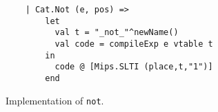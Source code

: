 \begin{figure}
    \centering
    \begin{lstlisting}
    | Cat.Not (e, pos) =>
        let
          val t = "_not_"^newName()
          val code = compileExp e vtable t
        in
          code @ [Mips.SLTI (place,t,"1")]
        end
    \end{lstlisting}
    \label{fig:compiler:not}
    \caption{Implementation of \texttt{not}.}
\end{figure}

